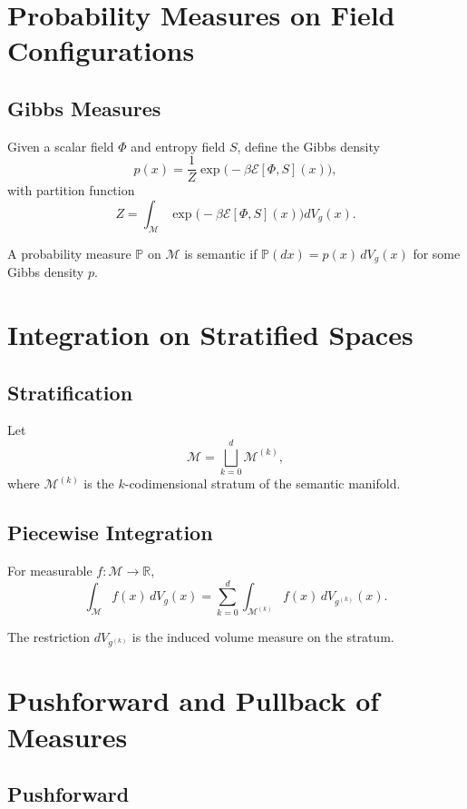 \section{Probability Measures on Field Configurations}

\subsection{Gibbs Measures}

Given a scalar field $\Phi$ and entropy field $S$, define the Gibbs density
\[
p(x) = \frac{1}{Z} \exp\bigl(-\beta \mathcal{E}[\Phi,S](x)\bigr),
\]
with partition function
\[
Z = \int_{\mathcal{M}} \exp\bigl(-\beta \mathcal{E}[\Phi,S](x)\bigr) dV_g(x).
\]

\begin{definition}
A probability measure $\mathbb{P}$ on $\mathcal{M}$ is semantic if $\mathbb{P}(dx) = p(x)\,dV_g(x)$ for some Gibbs density $p$.
\end{definition}

\section{Integration on Stratified Spaces}

\subsection{Stratification}

Let
\[
\mathcal{M} = \bigsqcup_{k=0}^{d} \mathcal{M}^{(k)},
\]
where $\mathcal{M}^{(k)}$ is the $k$-codimensional stratum of the semantic manifold.

\subsection{Piecewise Integration}

For measurable $f:\mathcal{M}\to\mathbb{R}$,
\[
\int_{\mathcal{M}} f(x)\, dV_g(x)
  = \sum_{k=0}^{d} \int_{\mathcal{M}^{(k)}} f(x)\, dV_{g^{(k)}}(x).
\]

The restriction $dV_{g^{(k)}}$ is the induced volume measure on the stratum.

\section{Pushforward and Pullback of Measures}

\subsection{Pushforward}

